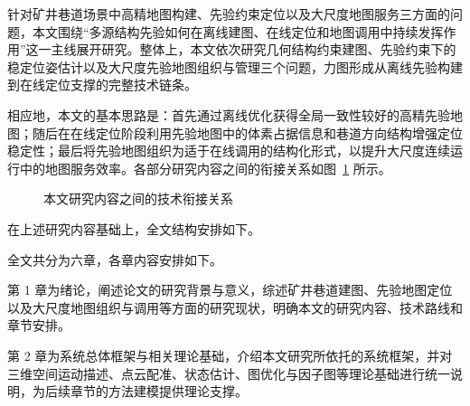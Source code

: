 针对矿井巷道场景中高精地图构建、先验约束定位以及大尺度地图服务三方面的问题，本文围绕“多源结构先验如何在离线建图、在线定位和地图调用中持续发挥作用”这一主线展开研究。整体上，本文依次研究几何结构约束建图、先验约束下的稳定位姿估计以及大尺度先验地图组织与管理三个问题，力图形成从离线先验构建到在线定位支撑的完整技术链条。

相应地，本文的基本思路是：首先通过离线优化获得全局一致性较好的高精先验地图；随后在在线定位阶段利用先验地图中的体素占据信息和巷道方向结构增强定位稳定性；最后将先验地图组织为适于在线调用的结构化形式，以提升大尺度连续运行中的地图服务效率。各部分研究内容之间的衔接关系如图~\ref{fig:ch1_tech_route} 所示。

\begin{figure}[htbp]
    \centering
    \caption{本文研究内容之间的技术衔接关系}
    \label{fig:ch1_tech_route}
\end{figure}

在上述研究内容基础上，全文结构安排如下。

全文共分为六章，各章内容安排如下。

第 1 章为绪论，阐述论文的研究背景与意义，综述矿井巷道建图、先验地图定位以及大尺度地图组织与调用等方面的研究现状，明确本文的研究内容、技术路线和章节安排。

第 2 章为系统总体框架与相关理论基础，介绍本文研究所依托的系统框架，并对三维空间运动描述、点云配准、状态估计、图优化与因子图等理论基础进行统一说明，为后续章节的方法建模提供理论支撑。

